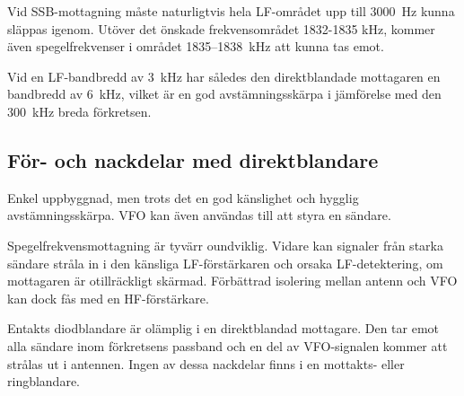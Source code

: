 Vid SSB-mottagning måste naturligtvis hela LF-området upp till 3000~Hz
kunna släppas igenom. Utöver det önskade frekvensområdet 1832-1835
kHz, kommer även spegelfrekvenser i området 1835--1838~kHz att kunna
tas emot.

Vid en LF-bandbredd av 3~kHz har således den direktblandade mottagaren
en bandbredd av 6~kHz, vilket är en god avstämningsskärpa i jämförelse
med den 300~kHz breda förkretsen.

\subsection{För- och nackdelar med direktblandare}

Enkel uppbyggnad, men trots det en god känslighet och hygglig
avstämningsskärpa. VFO kan även användas till att styra en sändare.

Spegelfrekvensmottagning är tyvärr oundviklig. Vidare kan signaler
från starka sändare stråla in i den känsliga LF-förstärkaren och
orsaka LF-detektering, om mottagaren är otillräckligt
skärmad. Förbättrad isolering mellan antenn och VFO kan dock fås med
en HF-förstärkare.

Entakts diodblandare är olämplig i en direktblandad mottagare. Den tar
emot alla sändare inom förkretsens passband och en del av VFO-signalen
kommer att strålas ut i antennen. Ingen av dessa nackdelar finns i en
mottakts- eller ringblandare.
